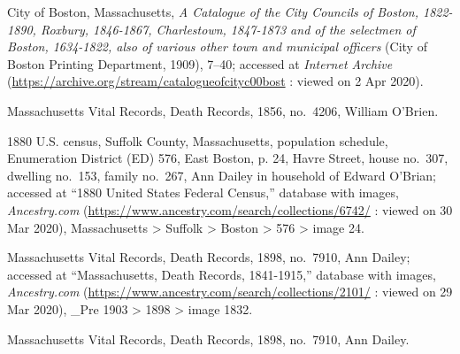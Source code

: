 \begin{thebibliography}{999}
City of Boston, Massachusetts, \textit{A Catalogue of the City Councils of Boston, 1822-1890, Roxbury, 1846-1867, Charlestown, 1847-1873 and of the selectmen of Boston, 1634-1822, also of various other town and municipal officers} (City of Boston Printing Department, 1909), 7--40; accessed at \textit{Internet Archive} (\url{https://archive.org/stream/catalogueofcityc00bost} : viewed on 2 Apr 2020).

Massachusetts Vital Records, Death Records, 1856, no.\ 4206, William O'Brien.

1880 U.S. census, Suffolk County, Massachusetts, population schedule, Enumeration District (ED) 576, East Boston, p. 24, Havre Street, house no.\ 307, dwelling no.\ 153, family no.\ 267, Ann Dailey in household of Edward O'Brian; accessed at ``1880 United States Federal Census,'' database with images, \textit{Ancestry.com} (\url{https://www.ancestry.com/search/collections/6742/} : viewed on 30 Mar 2020), Massachusetts > Suffolk > Boston > 576 > image 24.

Massachusetts Vital Records, Death Records, 1898, no.\ 7910, Ann Dailey; accessed at ``Massachusetts, Death Records, 1841-1915,'' database with images, \textit{Ancestry.com} (\url{https://www.ancestry.com/search/collections/2101/} : viewed on 29 Mar 2020), \_Pre 1903 > 1898 > image 1832.

Massachusetts Vital Records, Death Records, 1898, no.\ 7910, Ann Dailey.

\end{thebibliography}